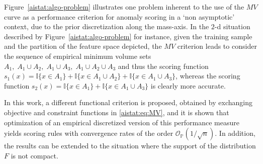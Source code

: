 Figure~\ref{aistat:algo-problem} illustrates one problem inherent to the use of the $MV$ curve as a performance criterion for anomaly scoring in a `non asymptotic' context, due to the prior discretization along the mass-axis. In the $2$-d situation described by Figure~\ref{aistat:algo-problem} for instance, given the training sample and the partition of the feature space depicted, 
the $MV$ criterion leads to consider the sequence of empirical minimum volume sets $A_1,\; A_1\cup A_2,\; A_1\cup A_3,\; A_1\cup A_2\cup A_3$ and thus the scoring function $s_1(x)=\mathbb{I}\{x\in A_1  \}+ \mathbb{I}\{x\in A_1\cup A_2  \} + \mathbb{I}\{x\in A_1\cup A_3  \}$, whereas the scoring function $s_2(x)=\mathbb{I}\{x\in A_1  \}+ \mathbb{I}\{x\in A_1\cup A_3  \}$ is clearly more accurate.
\par In this work, a different functional criterion is proposed, obtained by exchanging objective and constraint functions in \eqref{aistat:eq:MV}, and it is shown that optimization of an empirical discretized version of this performance measure yields scoring rules with convergence rates of the order $\mathcal{O}_{\mathbb{P}}(1/\sqrt{n})$. In addition, the results can be extended to the situation where the support of the distribution $F$ is not compact.
